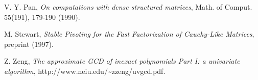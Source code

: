 \documentclass{article}
\newcommand{\tmem}[1]{{\em #1\/}}
\begin{document}
\begin{thebibliography}{}
  { V. Y. Pan, {\tmem{On computations with dense structured
  matrices}}, Math. of Comput. 55(191), 179-190 (1990).}
  
  { M. Stewart, {\tmem{Stable Pivoting for the Fast Factorization
  of Cauchy-Like Matrices}}, preprint (1997).}
  
  { Z. Zeng, {\tmem{The approximate GCD of inexact polynomials
  Part I: a univariate algorithm}}, http://www.neiu.edu/\~{ }zzeng/uvgcd.pdf.}
  
  
\end{thebibliography}
\end{document}
